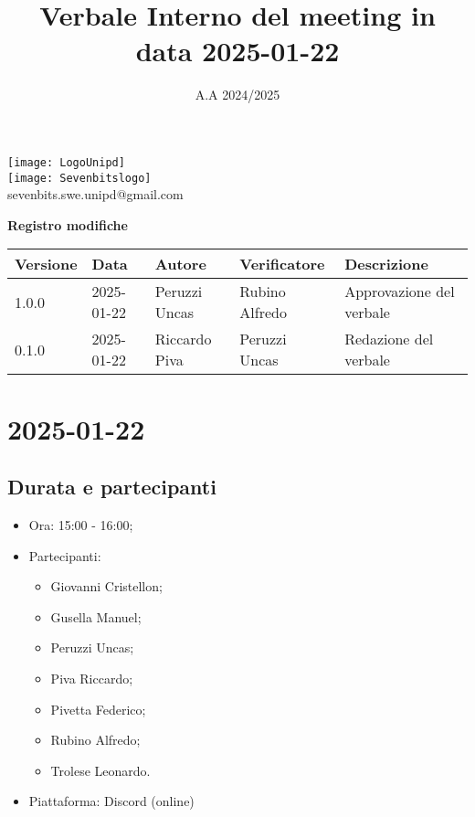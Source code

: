 \documentclass[10pt]{article}
\title{Verbale Interno del meeting in data 2025-01-22}
\date{A.A 2024/2025}
\begin{document}
\maketitle
\begin{center}
\texttt{[image: LogoUnipd]}\\
\texttt{[image: Sevenbitslogo]}\\
sevenbits.swe.unipd@gmail.com\\
\vspace{2mm}

\textbf{Registro modifiche}\\
\vspace{2mm}
\begin{tabularx}{\textwidth}{|l|l|l|l|X|}
\hline
\textbf{Versione} & \textbf{Data} & \textbf{Autore} & \textbf{Verificatore} & \textbf{Descrizione} \\
\hline
1.0.0 & 2025-01-22 & Peruzzi Uncas & Rubino Alfredo & Approvazione del verbale \\
\hline
0.1.0 & 2025-01-22 & Riccardo Piva & Peruzzi Uncas & Redazione del verbale \\
\hline
\end{tabularx}
\end{center}

\newpage
\tableofcontents
\newpage
\section{2025-01-22}
\subsection{Durata e partecipanti}
\begin{itemize}
\item Ora: 15:00 - 16:00;
\item Partecipanti:
	\begin{itemize}
    	\item Giovanni Cristellon;
		\item Gusella Manuel;
		\item Peruzzi Uncas;
		\item Piva Riccardo;
		\item Pivetta Federico;
		\item Rubino Alfredo;
		\item Trolese Leonardo.
	\end{itemize}
\item Piattaforma: Discord (online)
\end{itemize}
\end{document}
